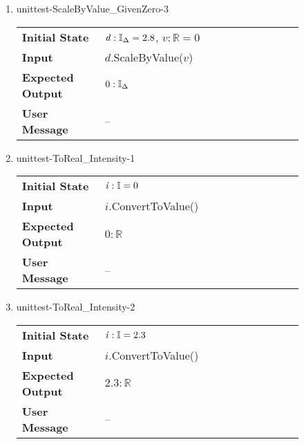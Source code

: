 \begin{enumerate}
    \item{unittest-ScaleByValue\_GivenZero-3}
    \begin{table}[H]
        \centering
        \begin{tabular}{P{0.25\linewidth}P{0.6\linewidth}}
            \toprule
            \textbf{Initial State} & $\mathit{d} : \mathbb{I}_{\Delta} = 2.8$,
            $v : \mathbb{R} = 0$ \\
            \textbf{Input} & $\mathit{d}$.ScaleByValue($\mathit{v}$) \\
            \midrule
            \textbf{Expected Output} & $0 : \mathbb{I}_{\Delta}$ \\
            \textbf{User Message} & -- \\ \bottomrule
        \end{tabular}
    \end{table}


    \item{unittest-ToReal\_Intensity-1}
    \begin{table}[H]
        \centering
        \begin{tabular}{P{0.25\linewidth}P{0.6\linewidth}}
            \toprule
            \textbf{Initial State} & $\mathit{i} : \mathbb{I} = 0$ \\
            \textbf{Input} & $\mathit{i}$.ConvertToValue() \\
            \midrule
            \textbf{Expected Output} & $0 : \mathbb{R}$ \\
            \textbf{User Message} & -- \\ \bottomrule
        \end{tabular}
    \end{table}

    \item{unittest-ToReal\_Intensity-2}
    \begin{table}[H]
        \centering
        \begin{tabular}{P{0.25\linewidth}P{0.6\linewidth}}
            \toprule
            \textbf{Initial State} & $\mathit{i} : \mathbb{I} = 2.3$
            \\
            \textbf{Input} & $\mathit{i}$.ConvertToValue() \\
            \midrule
            \textbf{Expected Output} & $2.3 : \mathbb{R}$ \\
            \textbf{User Message} & -- \\ \bottomrule
        \end{tabular}
    \end{table}


\end{enumerate}
